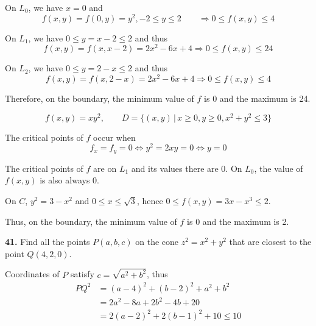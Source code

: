 \documentclass[a4paper,12pt]{article}
\newcommand{\exercise}[1]{\noindent\textbf{#1.}}
\begin{document}
On $L_0$, we have $x = 0$ and
\[f(x, y) = f(0, y) = y^2, -2 \leq y \leq 2
\qquad\Longrightarrow 0 \leq f(x, y) \leq 4\]

On $L_1$, we have $0 \leq y = x - 2 \leq 2$ and thus
\[f(x, y) = f(x, x - 2) = 2x^2 - 6x + 4
\Longrightarrow 0 \leq f(x, y) \leq 24\]

On $L_2$, we have $0 \leq y = 2 - x \leq 2$ and thus
\[f(x, y) = f(x, 2 - x) = 2x^2 - 6x + 4
\Longrightarrow 0 \leq f(x, y) \leq 4\]

Therefore, on the boundary, the minimum value of $f$ is 0
and the maximum is 24.

\[f(x, y) = xy^2,\qquad
D = \{(x, y) \,|\, x \geq 0, y \geq 0, x^2 + y^2 \leq 3\}\tag{34}\]

The critical points of $f$ occur when
\[f_x = f_y = 0 \iff y^2 = 2xy = 0 \iff y = 0\]


The critical points of $f$ are on $L_1$ and its values there are 0.
On $L_0$, the value of $f(x, y)$ is also always 0.

On $C$, $y^2 = 3 - x^2$ and $0 \leq x \leq \sqrt 3$, hence
$0 \leq f(x, y) = 3x - x^3 \leq 2$.

Thus, on the boundary, the minimum value of $f$ is 0
and the maximum is 2.\pagebreak

\exercise{41} Find all the points $P(a, b, c)$ on the cone $z^2 = x^2 + y^2$
that are closest to the point $Q(4, 2, 0)$.

Coordinates of $P$ satisfy $c = \sqrt{a^2 + b^2}$, thus
\begin{align*}
  PQ^2 &= (a - 4)^2 + (b - 2)^2 + a^2 + b^2\\
  &= 2a^2 - 8a + 2b^2 - 4b + 20\\
  &= 2(a - 2)^2 + 2(b - 1)^2 + 10 \leq 10
\end{align*}
\end{document}
